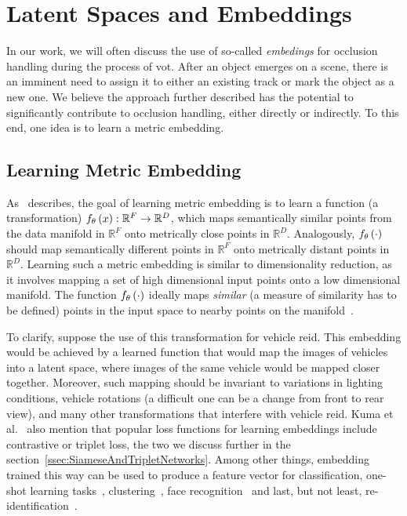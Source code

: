 \section{Latent Spaces and Embeddings}
\label{sec:LatentSpacesAndEmbeddings}

In our work, we will often discuss the use of so-called \emph{embedings} for occlusion handling during the process of \gls{vot}. After an object emerges on a scene, there is an imminent need to assign it to either an existing track or mark the object as a new one. We believe the approach further described has the potential to significantly contribute to occlusion handling, either directly or indirectly. To this end, one idea is to learn a metric embedding. 

\subsection{Learning Metric Embedding}
\label{ssec:LearningMetricEmbedding}

As~\cite{hermans2017triplet} describes, the goal of learning metric embedding is to learn a function (a transformation) ${f_\theta} \left( x \right): \mathbb{R}^F \to \mathbb{R}^D$, which maps semantically similar points from the data manifold in $\mathbb{R}^F$ onto metrically close points in $\mathbb{R}^D$. Analogously, ${f_\theta} \left( \cdot \right)$ should map semantically different points in $\mathbb{R}^F$ onto metrically distant points in $\mathbb{R}^D$. Learning such a metric embedding is similar to dimensionality reduction, as it involves mapping a set of high dimensional input points onto a low dimensional manifold. The function ${f_\theta} \left( \cdot \right)$ ideally maps \emph{similar} (a measure of similarity has to be defined) points in the input space to nearby points on the manifold~\cite{hadsell2006dimreduction}.

To clarify, suppose the use of this transformation for vehicle \gls{reid}. This embedding would be achieved by a learned function that would map the images of vehicles into a latent space, where images of the same vehicle would be mapped closer together. Moreover, such mapping should be invariant to variations in lighting conditions, vehicle rotations (a difficult one can be a change from front to rear view), and many other transformations that interfere with vehicle \gls{reid}. Kuma et al.~\cite{kuma2019vehiclereid} also mention that popular loss functions for learning embeddings include contrastive or triplet loss, the two we discuss further in the section~\ref{ssec:SiameseAndTripletNetworks}. Among other things, embedding trained this way can be used to produce a feature vector for classification, one-shot learning tasks~\cite{koch2015siameseoneshot}, clustering~\cite{schroff2015facenet}, face recognition~\cite{parkhi2015deepface} and last, but not least, re-identification~\cite{kuma2019vehiclereid}.

